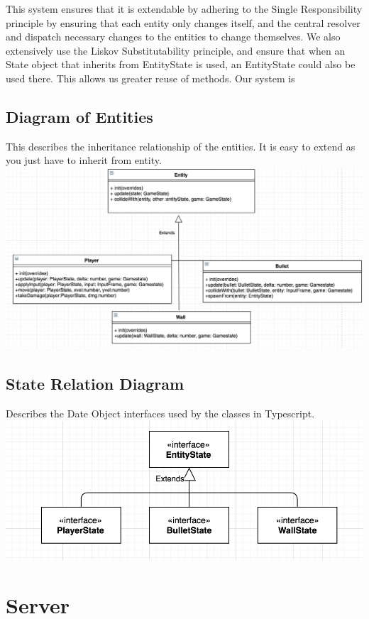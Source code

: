 \documentclass[12pt]{report}
\begin{document}
This system ensures that it is extendable by adhering to the Single Responsibility principle by ensuring that each entity only changes itself, and the central resolver and dispatch necessary changes to the entities to change themselves. We also extensively use the Liskov Substitutability principle, and ensure that when an State object that inherits from EntityState is used, an EntityState could also be used there. This allows us greater reuse of methods. Our system is 

\subsection{Diagram of Entities}
This describes the inheritance relationship of the entities. It is easy to extend as you just have to inherit from entity.\\
\includegraphics[width=\linewidth]{images/entities.png}

\subsection{State Relation Diagram}
Describes the Date Object interfaces used by the classes in Typescript. \\
\includegraphics[width=\linewidth]{images/data_objects.png}


\section{Server}
\end{document}
